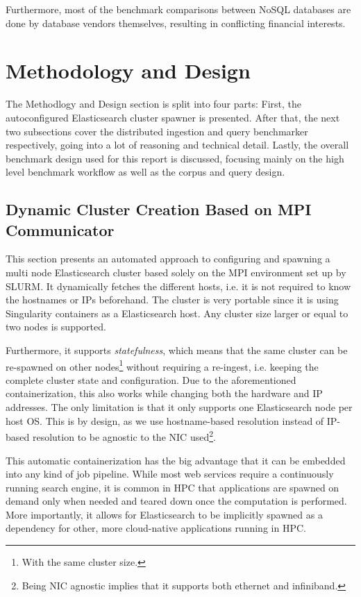 Furthermore, most of the benchmark comparisons between NoSQL databases are done by database vendors themselves, resulting in conflicting financial interests.

\section{Methodology and Design}
The Methodlogy and Design section is split into four parts: First, the autoconfigured Elasticsearch cluster spawner is presented. After that, the next two subsections cover the distributed ingestion and query benchmarker respectively, going into a lot of reasoning and technical detail. Lastly, the overall benchmark design used for this report is discussed, focusing mainly on the high level benchmark workflow as well as the corpus and query design.

\subsection{Dynamic Cluster Creation Based on MPI Communicator}
This section presents an automated approach to configuring and spawning a multi node Elasticsearch cluster based solely on the \ac{MPI} environment set up by SLURM. It dynamically fetches the different hosts, i.e. it is not required to know the hostnames or IPs beforehand. The cluster is very portable since it is using Singularity \cite{singularity} containers as a Elasticsearch host. Any cluster size larger or equal to two nodes is supported.

Furthermore, it supports \emph{statefulness}, which means that the same cluster can be re-spawned on other nodes\footnote{With the same cluster size.} without requiring a re-ingest, i.e. keeping the complete cluster state and configuration. Due to the aforementioned containerization, this also works while changing both the hardware and IP addresses. The only limitation is that it only supports one Elasticsearch node per host OS. This is by design, as we use hostname-based resolution instead of IP-based resolution to be agnostic to the \ac{NIC} used\footnote{Being \ac{NIC} agnostic implies that it supports both ethernet and infiniband.}. 

This automatic containerization has the big advantage that it can be embedded into any kind of job pipeline. While most web services require a continuously running search engine, it is common in \ac{HPC} that applications are spawned on demand only when needed and teared down once the computation is performed. More importantly, it allows for Elasticsearch to be implicitly spawned as a dependency for other, more cloud-native applications running in \ac{HPC}.\\

